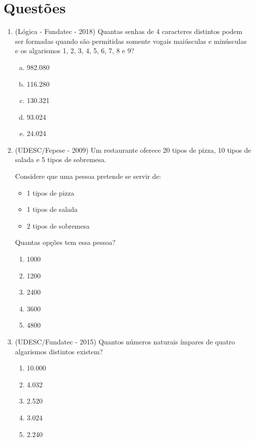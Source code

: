 \section{Questões}

\begin{enumerate}
 \item (Lógica - Fundatec - 2018) Quantas senhas de 4 caracteres distintos podem ser formadas quando são permitidas somente vogais maiúsculas e minúsculas e os algarismos 1, 2, 3, 4, 5, 6, 7, 8 e 9?
\begin{multicols}{2}
\begin{enumerate}[a)]
\item 982.080
\item 116.280
\item 130.321
\item 93.024
\item 24.024
\end{enumerate}
\end{multicols}

 \item (UDESC/Fepese - 2009) Um restaurante oferece 20 tipos de pizza, 10 tipos de salada e 5 tipos de sobremesa.

  Considere que uma pessoa pretende se servir de:
  \begin{itemize}
   \item 1 tipos de pizza
   \item 1 tipos de salada
   \item 2 tipos de sobremesa
  \end{itemize}

  Quantas opções tem essa pessoa?

  \begin{enumerate}
  \item 1000
  \item 1200
  \item 2400
  \item 3600
  \item 4800
 \end{enumerate}

 \newpage
 \item (UDESC/Fundatec - 2015) Quantos números naturais ímpares de quatro algarismos distintos existem?
 \begin{enumerate}
 \item 10.000
 \item 4.032
 \item 2.520
 \item 3.024
 \item 2.240
 \end{enumerate}


\end{enumerate}
